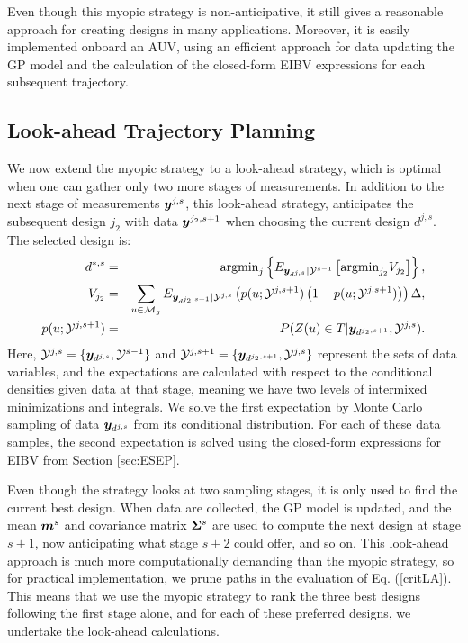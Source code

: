 \documentclass[aoas]{imsart}
\begin{document}
Even though this myopic strategy is non-anticipative, it still gives a
reasonable approach for creating designs in many
applications. Moreover, it is easily implemented onboard an AUV,
using an efficient approach for data updating the GP model and the
calculation of the closed-form EIBV expressions for each
subsequent trajectory.


\subsection{Look-ahead Trajectory Planning}
\label{sec:LA}

We now extend the myopic strategy to a look-ahead strategy, which is
optimal when one can gather only two more stages of measurements. In
addition to the next stage of measurements ${\boldsymbol y}^{j,s}$, this
look-ahead strategy, anticipates the subsequent design $j_2$ with
data ${\boldsymbol y}^{j_2,s+1}$ when choosing the current design $d^{j,s}$.  The
selected design is:
\begin{eqnarray}\label{critLA}
    d^{*,s} &=& \mbox{argmin}_{j} \left\{ E_{\by_{d^{j,s}}|\mathcal{Y}^{s-1}} \left[ \mbox{argmin}_{j_2}  V_{j_2} \right] \right\}, \nonumber \\
V_{j_2} & = & \sum_{\x \in \mathcal{M}_g} E_{\by_{d^{j_2,s+1}}|\mathcal{Y}^{j,s}} \left( p(\x;\mathcal{Y}^{j,s+1})\left( 1-p(\x;\mathcal{Y}^{j,s+1})\right) \right) \Delta, \nonumber \\
    p(\x;\mathcal{Y}^{j,s+1}) &=& P(Z(\x) \in T |\by_{d^{j_2,s+1}},\mathcal{Y}^{j,s}). \nonumber
\end{eqnarray}
Here, $\mathcal{Y}^{j,s}=\{{\boldsymbol y}_{d^{j,s}},\mathcal{Y}^{s-1}\}$ and
$\mathcal{Y}^{j,s+1}=\{{\boldsymbol y}_{d^{j_2,s+1}},\mathcal{Y}^{j,s}\}$ represent
the sets of data variables, and the expectations are calculated with respect to
the conditional densities given data at that stage, meaning we have two levels of intermixed minimizations and integrals.
We solve the
first expectation by Monte Carlo sampling of data ${\boldsymbol y}_{d^{j,s}}$ from its
conditional distribution. For each of these data samples, the second expectation
is solved using the closed-form expressions for EIBV from
Section \ref{sec:ESEP}.

Even though the strategy looks at two sampling stages, it is only used to find
the current best design. When data are collected, the GP model is
updated, and the mean ${\boldsymbol m}^{s}$ and covariance matrix ${\boldsymbol \Sigma}^{s}$ are
used to compute the next design at stage $s+1$, now anticipating what
stage $s+2$ could offer, and so on.
This look-ahead approach is much more computationally demanding than
the myopic strategy, so for practical implementation, we prune paths
in the evaluation of Eq. (\ref{critLA}). This means that we use the myopic
strategy to rank the three best designs following the first stage alone, and
for each of these preferred designs, we undertake the look-ahead calculations.
\end{document}

